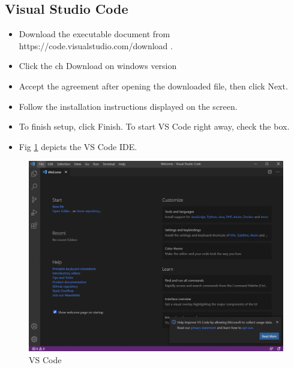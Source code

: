 \documentclass[10pt]{article}
\begin{document}
\subsection{Visual Studio Code}
\begin{itemize}
    \item Download the executable document from https://code.visualstudio.com/download \cite{3}.
\item Click the ch Download on windows version
\item Accept the agreement after opening the downloaded file, then click Next.
\item Follow the installation instructions displayed on the screen.
\item To finish setup, click Finish. To start VS Code right away, check the box.
\item Fig \ref{fig:vsc} depicts the VS Code IDE.
\end{itemize}
\begin{figure}[H]
    \begin{center}
        \includegraphics[width=0.7\linewidth, frame]{CA2-template/CM3.png}
       \caption{VS Code \label{fig:vsc}}
    \end{center}
\end{figure}
\end{document}
